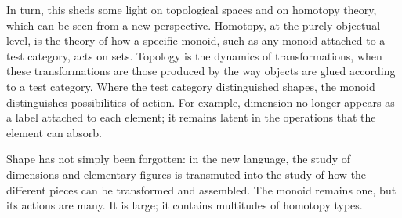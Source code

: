 \documentclass[11pt]{amsart}
\theoremstyle{definition}
\theoremstyle{remark}
\numberwithin{figure}{section}%
\begin{document}
In turn, this sheds some light on topological spaces and on homotopy theory, which can be seen from a new perspective. Homotopy, at the purely objectual level, is the theory of how a specific monoid, such as any monoid attached to a test category, acts on sets. Topology is the dynamics of transformations, when these transformations are those produced by the way objects are glued according to a test category. Where the test category distinguished shapes, the monoid distinguishes possibilities of action. For example, dimension no longer appears as a label attached to each element; it remains latent in the operations that the element can absorb.

Shape has not simply been forgotten: in the new language, the study of dimensions and elementary figures is transmuted into the study of how the different pieces can be transformed and assembled. The monoid remains one, but its actions are many. It is large; it contains multitudes of homotopy types.



\end{document}
